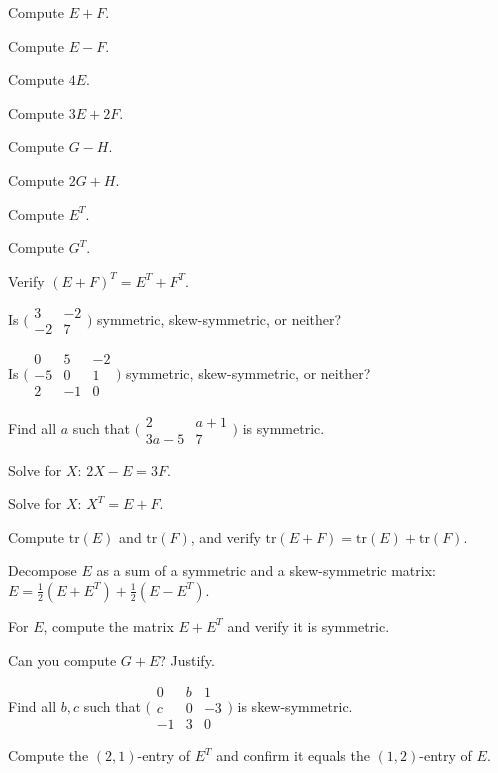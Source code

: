 \begin{problems}
  \item Compute $E + F$.
  \item Compute $E - F$.
  \item Compute $4 E$.
  \item Compute $3 E + 2 F$.
  \item Compute $G - H$.
  \item Compute $2 G + H$.
  \item Compute $E^{T}$.
  \item Compute $G^{T}$.
  \item Verify $(E + F)^{T} = E^{T} + F^{T}$.
  \item Is $\bigl(\begin{smallmatrix} 3 & -2 \\ -2 & 7 \end{smallmatrix}\bigr)$ symmetric, skew-symmetric, or neither?
  \item Is $\bigl(\begin{smallmatrix} 0 & 5 & -2 \\ -5 & 0 & 1 \\ 2 & -1 & 0 \end{smallmatrix}\bigr)$ symmetric, skew-symmetric, or neither?
  \item Find all $a$ such that $\bigl(\begin{smallmatrix} 2 & a+1 \\ 3a-5 & 7 \end{smallmatrix}\bigr)$ is symmetric.
  \item Solve for $X$: $2 X - E = 3 F$.
  \item Solve for $X$: $X^{T} = E + F$.
  \item Compute $\mathrm{tr}(E)$ and $\mathrm{tr}(F)$, and verify $\mathrm{tr}(E + F) = \mathrm{tr}(E) + \mathrm{tr}(F)$.
  \item Decompose $E$ as a sum of a symmetric and a skew-symmetric matrix: $E = \tfrac{1}{2}(E + E^{T}) + \tfrac{1}{2}(E - E^{T})$.
  \item For $E$, compute the matrix $E + E^{T}$ and verify it is symmetric.
  \item Can you compute $G + E$? Justify.
  \item Find all $b, c$ such that $\bigl(\begin{smallmatrix} 0 & b & 1 \\ c & 0 & -3 \\ -1 & 3 & 0 \end{smallmatrix}\bigr)$ is skew-symmetric.
  \item Compute the $(2, 1)$-entry of $E^{T}$ and confirm it equals the $(1, 2)$-entry of $E$.

\end{problems}
